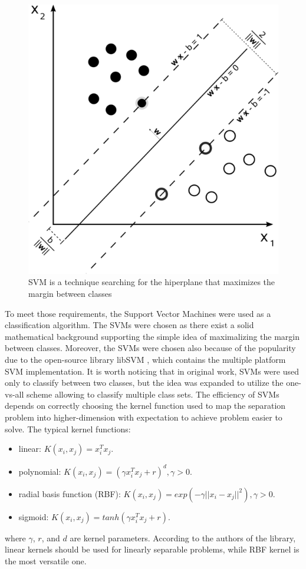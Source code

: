 \begin{figure}[htb]
\centering
 \includegraphics[width=0.6\columnwidth]{figures/SVM.png}
 \caption[]{SVM is a technique searching for the hiperplane that maximizes the margin between classes\footnotemark}
 \label{svmmargin}
\end{figure}



To meet those requirements, the Support Vector Machines \cite{Cortes:SVM} were used as a classification algorithm.
The SVMs were chosen as there exist a solid mathematical background supporting the simple idea of maximalizing the margin between classes.
Moreover, the SVMs were chosen also because of the popularity due to the open-source library libSVM \cite{libSVM}, which contains the multiple platform SVM implementation.
It is worth noticing that in original work, SVMs were used only to classify between two classes, but the idea was expanded to utilize the one-vs-all scheme allowing to classify multiple class sets.
The efficiency of SVMs depends on correctly choosing the kernel function used to map the separation problem into higher-dimension with expectation to achieve problem easier to solve.
The typical kernel functions:
\begin{itemize}
\item linear: $K(x_i, x_j) = x_i^Tx_j$.
\item polynomial: $K(x_i, x_j) = (\gamma x_i^Tx_j + r)^d, \gamma > 0$.
\item radial basis function (RBF): $K(x_i, x_j) = exp(-\gamma ||x_i - x_j||^2), \gamma > 0$.
\item sigmoid: $K(x_i, x_j) = tanh(\gamma x_i^Tx_j+r)$.
\end{itemize}
where $\gamma$, $r$, and $d$ are kernel parameters. According to the authors of the library, linear kernels should be used for linearly separable problems, while RBF kernel is the most versatile one.

